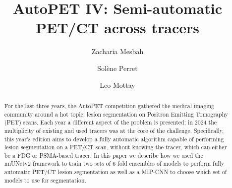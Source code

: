 \documentclass[runningheads]{llncs}
\begin{document}
%


\title{AutoPET IV: Semi-automatic PET/CT across tracers}
%
%


\author{
Zacharia Mesbah \and
Solène Perret \and
Leo Mottay \\
}
%

\authorrunning{}
%

%
\maketitle   
%
\begin{abstract}

For the last three years, the AutoPET competition gathered the medical imaging community around a hot topic: lesion segmentation on Positron Emitting Tomography (PET) scans. Each year a different aspect of the problem is presented; in 2024 the multiplicity of existing and used tracers was at the core of the challenge. Specifically, this year's edition aims to develop a fully automatic algorithm capable of performing lesion segmentation on a PET/CT scan, without knowing the tracer, which can either be a FDG or PSMA-based tracer.
%
In this paper we describe how we used the nnUNetv2\cite{isensee2018nnunet} framework to train two sets of 6 fold ensembles of models to perform fully automatic PET/CT lesion segmentation as well as a MIP-CNN to choose which set of models to use for segmentation.
%
 

\end{abstract}
\end{document}
